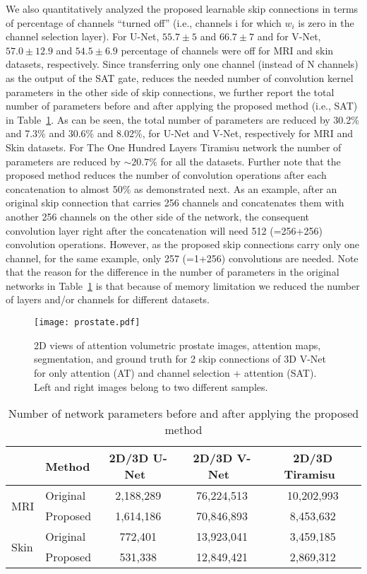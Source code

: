 \documentclass{article}
\begin{document}
We also quantitatively analyzed the proposed learnable skip connections in terms of percentage of channels “turned off” (i.e., channels i for which $w_i$ is zero in the channel selection layer). For U-Net, $55.7\pm5$ and $66.7\pm7$ and for V-Net, $57.0\pm12.9$ and $54.5\pm6.9$ percentage of channels were off for MRI and skin datasets, respectively. Since transferring only one channel (instead of N channels) as the output of the SAT gate, reduces the needed number of convolution kernel parameters in the other side of skip connections, we further report the total number of parameters before and after applying the proposed method (i.e., SAT) in Table~\ref{table3}. As can be seen, the total number of parameters are reduced by 30.2\% and 7.3\% and 30.6\% and 8.02\%, for U-Net and V-Net, respectively for MRI and Skin datasets. For The One Hundred Layers Tiramisu network the number of parameters are reduced by $\sim20.7\%$ for all the datasets. Further note that the proposed method reduces the number of convolution operations after each concatenation to almost 50\% as demonstrated next. As an example, after an original skip connection that carries 256 channels and concatenates them with another 256 channels on the other side of the network, the consequent convolution layer right after the concatenation will need 512 (=256+256) convolution operations. However, as the proposed skip connections carry only one channel, for the same example, only 257 (=1+256) convolutions are needed. Note that the reason for the difference in the number of parameters in the original networks in Table~\ref{table3} is that because of memory limitation we reduced the number of layers and/or channels for different datasets.


\begin{figure}
\centering
\texttt{[image: prostate.pdf]}
\caption{2D views of attention volumetric prostate images, attention maps, segmentation, and ground truth for 2 skip connections of 3D V-Net for only attention (AT) and channel selection + attention (SAT). Left and right images belong to two different samples.}
\label{figure7}
\end{figure}

\begin{table}
\small
\setlength{\tabcolsep}{5pt}
\centering
\caption{Number of network parameters before and after applying the proposed method}
\label{table3}
\begin{tabular}{llccc}
\hline
& Method   & 2D/3D U-Net~\cite{ronneberger2015u,cciccek20163d}  & 2D/3D V-Net~\cite{milletari2016v} & 2D/3D Tiramisu~\cite{jegou2017one}       \\ \hline
\multirow{2}{*}{MRI}  & Original  & 2,188,289 & 76,224,513 & 10,202,993\\
                      & Proposed & 1,614,186 & 70,846,893 & 8,453,632 \\ \hline
\multirow{2}{*}{Skin} & Original & 772,401   & 13,923,041  & 3,459,185\\
                      & Proposed & 531,338   & 12,849,421 & 2,869,312\\ \hline
\end{tabular}
\end{table}
\end{document}
